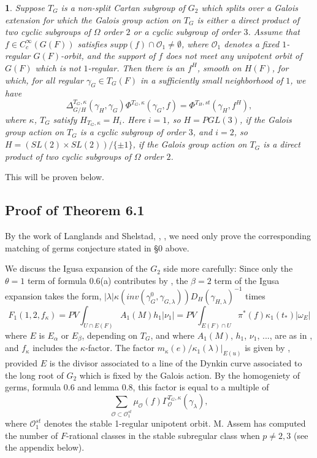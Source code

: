\documentclass[12pt,letterpaper]{amsart}
\newcommand{\proclaimname}{}
\newtheorem*{proclaimx}{\proclaimname}
\newenvironment{proclaim}[1]%
  {\renewcommand{\proclaimname}{#1}\begin{proclaimx}}{\end{proclaimx}}
\begin{document}
\begin{proclaim}{Theorem 6.1} Suppose $T_G$ is a non-split Cartan subgroup
of $G_2$ which splits over a
Galois extension for which the Galois group action on $T_G$
is either a direct product of two cyclic subgroups of $\Omega$ order $2$
or a cyclic subgroup of order $3$.
Assume that $f\in C_c^\infty(G(F))$ satisfies $supp(f)\cap {\mathcal O}_1
\not= \emptyset$, where ${\mathcal O}_1$ denotes a fixed $1$-regular
$G(F)$-orbit, and the support of $f$ does not meet any unipotent orbit
of $G(F)$ which is not $1$-regular. Then there is an $f^H$, smooth on
$H(F)$, for which, for all regular $\gamma_G\in T_G(F)$
in a sufficiently small neighborhood of $1$, we have
\[
\Delta_{G/H}^{T_G,\kappa}(\gamma_H,\gamma_G)
\Phi^{T_G,\kappa}(\gamma_G,f)=
\Phi^{T_H,st}(\gamma_H,f^H),
\]
where $\kappa$, $T_G$ satisfy
$H_{T_G,\kappa}=H_i$. Here $i=1$, so $H=PGL(3)$, if
the Galois group action on $T_G$
is a cyclic subgroup of order $3$, and
$i=2$, so $H=(SL(2)\times SL(2))/\{\pm 1\}$, if
the Galois group action on $T_G$ is
a direct product of two cyclic subgroups of $\Omega$ order $2$.
\end{proclaim}

This will be proven below.

\subsection*{Proof of Theorem 6.1}

By the work of Langlands and Shelstad, \cite{LS87}, \cite{LS90}, we need only
prove the corresponding matching of germs conjecture stated in
\S 0 above.

We discuss the Igusa expansion of the $G_2$ side more carefully:
Since only the $\theta=1$ term of formula 0.6(a)
contributes by \cite[ch 6, \S 2]{Ha92a},
the $\beta=2$ term of the Igusa expansion takes the form,
$|\lambda|\kappa(inv(\gamma_G^0,\gamma_{G,\lambda}))
D_H(\gamma_{H,\lambda})^{-1}$
times
\[
F_1(1,2,f_\kappa)=
PV\int_{U\cap E(F)}A_1(M)h_1|\nu_1|=
PV\int_{E(F)\cap U}\pi^*(f)\kappa_1(t_*)|\omega_E|
\tag{6.2}
\]
where $E$ is $E_\alpha$ or $E_\beta$, depending on $T_G$, and
where $A_1(M)$, $h_1$, $\nu_1$, ..., are as in \cite{La83},
and $f_\kappa$ includes the $\kappa$-factor. The factor
$m_\kappa(e)/\kappa_1(\lambda)|_{E(u)}$ is given by
\cite[Ch VI, \S 2 and Proposition 3.2]{Ha92a}, provided $E$ is the divisor
associated to a line of the Dynkin curve associated to the long root
of $G_2$ which is fixed by the Galois action.
By the homogeniety of germs, formula 0.6 and lemma 0.8,
this factor is equal to a multiple of
\[
\sum_{{\mathcal O}\subset {\mathcal O}_1^{st}}
\mu_{\mathcal O} (f)\Gamma^{T_G,\kappa}_{\mathcal O}(\gamma_\lambda),
\]
where ${\mathcal O}_1^{st}$ denotes the stable 1-regular unipotent orbit.
M. Assem has computed the number of $F$-rational classes in the
stable subregular class when $p\not= 2,3$ (see the appendix below).
\end{document}

